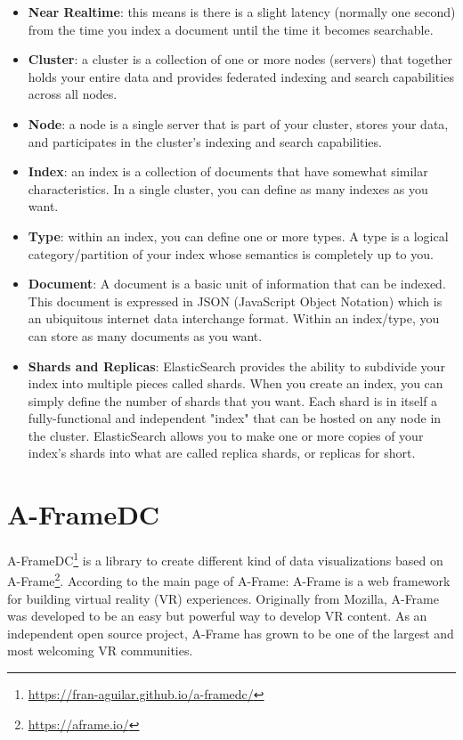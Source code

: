 \documentclass[a4paper, 12pt]{book}
\begin{document}
\begin{itemize}
    \item \textbf{Near Realtime}: this means is there is a slight latency (normally one second) from the time you index a document until the time it becomes searchable.
    \item \textbf{Cluster}: a cluster is a collection of one or more nodes (servers) that together holds your entire data and provides federated indexing and search capabilities across all nodes.
    \item \textbf{Node}: a node is a single server that is part of your cluster, stores your data, and participates in the cluster's indexing and search capabilities.
    \item \textbf{Index}: an index is a collection of documents that have somewhat similar characteristics. In a single cluster, you can define as many indexes as you want.
    \item \textbf{Type}: within an index, you can define one or more types. A type is a logical category/partition of your index whose semantics is completely up to you.
    \item \textbf{Document}: A document is a basic unit of information that can be indexed. This document is expressed in JSON (JavaScript Object Notation) which is an ubiquitous internet data interchange format. Within an index/type, you can store as many documents as you want.
    \item \textbf{Shards and Replicas}: ElasticSearch provides the ability to subdivide your index into multiple pieces called shards. When you create an index, you can simply define the number of shards that you want. Each shard is in itself a fully-functional and independent "index" that can be hosted on any node in the cluster. ElasticSearch allows you to make one or more copies of your index's shards into what are called replica shards, or replicas for short.
\end{itemize}

\section{A-FrameDC}
\label{sec:aframedc}

A-FrameDC\footnote{\url{https://fran-aguilar.github.io/a-framedc/}} is a library to create different kind of data visualizations based on A-Frame\footnote{\url{https://aframe.io/}}. According to the main page of A-Frame: A-Frame is a web framework for building virtual reality (VR) experiences. Originally from Mozilla, A-Frame was developed to be an easy but powerful way to develop VR content. As an independent open source project, A-Frame has grown to be one of the largest and most welcoming VR communities.
\end{document}
